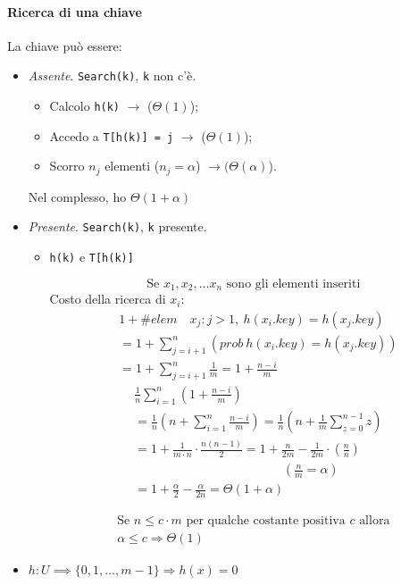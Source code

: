 \paragraph{Ricerca di una chiave} La chiave può essere:
\begin{itemize}
	\item \emph{Assente}. \texttt{Search(k)}, \texttt{k} non c'è.
	\begin{itemize}
		\item Calcolo \texttt{h(k)} $\rightarrow$ ($\Theta(1)$);
		\item Accedo a \texttt{T[h(k)] = j} $\rightarrow$ ($\Theta(1)$);
		\item Scorro $n_j$ elementi ($n_j = \alpha$) $\rightarrow (\Theta(\alpha)$).  
	\end{itemize}
	Nel complesso, ho $\Theta(1+\alpha)$

	\item \emph{Presente}. \texttt{Search(k)}, \texttt{k} presente.
	\begin{itemize}
		\item \texttt{h(k)} e \texttt{T[h(k)]}\par
			$$\text{Se } x_1, x_2,\dots x_n \text{ sono gli elementi inseriti}$$
		Costo della ricerca di $x_i$:
		\begin{align*}
			& 1 + \# elem \quad x_j : j > 1, \ h(x_i.key) = h(x_j.key) \\
			& = 1 + \displaystyle\sum_{j=i+1}^n \left(prob \ h(x_i.key) = h(x_j.key)\right) \\
			& = 1 + \displaystyle\sum_{j=i+1}^n \frac{1}{m} = 1 + \frac{n-i}{m}
		\end{align*}
		\begin{align*}
			& \frac{1}{n} \displaystyle\sum_{i=1}^n \left( 1 + \frac{n-i}{m} \right) \\
			& = \frac{1}{n} \left( n + \displaystyle\sum_{i=1}^n \frac{n-i}{m} \right) 
				= \frac{1}{n} \left( n + \frac{1}{m} \displaystyle\sum_{z=0}^{n-1} z \right) \\
			& = 1 + \frac{1}{m \cdot n} \cdot \frac{n(n-1)}{2} = 1 + \frac{n}{2m} - \frac{1}{2m} \cdot \left(\frac{n}{n} \right) \\
			& \hspace{5cm} \left(\frac{n}{m} = \alpha\right) \\
			& = 1 + \frac{\alpha}{2} - \frac{\alpha}{2n} = \Theta(1+\alpha)
		\end{align*}

		\begin{gather*}
			\text{Se } n \leq c \cdot m \text{ per qualche costante positiva } c \text{ allora}\\ 
			\alpha \leq c \Rightarrow \Theta(1)
		\end{gather*}
	\end{itemize}
	\item $h : U \implies \{ 0,1,\dots,m-1 \} \Rightarrow h(x) = 0$
\end{itemize}

